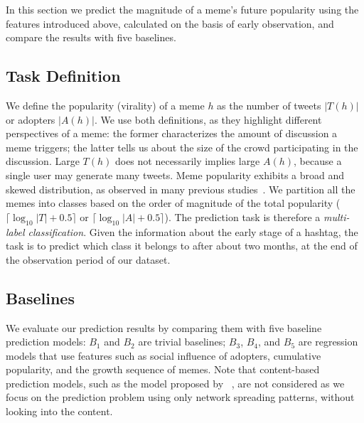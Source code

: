 \documentclass[letterpaper]{article}
\begin{document}
In this section we predict the magnitude of a meme's future popularity using the features introduced above, calculated on the basis of early observation, and compare the results with five baselines.

\subsection{Task Definition}

We define the popularity (virality) of a meme $h$ as the number of tweets $|T(h)|$ or adopters $|A(h)|$. We use both definitions, as they highlight different perspectives of a meme: the former characterizes the amount of discussion a meme triggers; the latter tells us about the size of the crowd participating in the discussion.  Large $T(h)$ does not necessarily implies large $A(h)$, because a single user may generate many tweets.
%
Meme popularity exhibits a broad and skewed distribution, as observed in many previous studies~\cite{Lerman:ICWSM2010,Weng:2012scirep}. We partition all the memes into classes based on the order of magnitude of the total popularity ($\lceil \log_{10} |T| + 0.5 \rceil$ or $\lceil \log_{10} |A| + 0.5 \rceil$).
The prediction task is therefore a \emph{multi-label classification}. Given the information about the early stage of a hashtag, the task is to predict which class it belongs to after about two months, at the end of the observation period of our dataset.



\subsection{Baselines}

We evaluate our prediction results by comparing them with five baseline prediction models: $B_1$ and $B_2$ are trivial baselines; $B_3$, $B_4$, and $B_5$ are regression models that use features such as social influence of adopters, cumulative popularity, and the growth sequence of memes. Note that content-based prediction models, such as the model proposed by \citeauthor{tsur2012wsdm}~, are not considered as we focus on the prediction problem using only network spreading patterns, without looking into the content.
\end{document}
